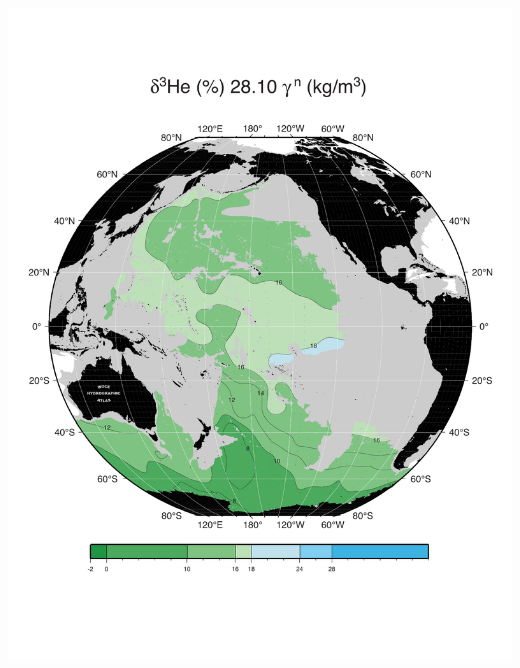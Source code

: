 \documentclass{beamer}
\begin{document}
\begin{frame}[plain,t]
\begin{columns}
\begin{column}{0.33\textwidth}
        \includegraphics[width=\textwidth]{delhe3_isopyc_final_pdf/pac2810_delhe3_final.pdf}
      \end{column}
    \end{columns} 
\end{frame}
\end{document}
